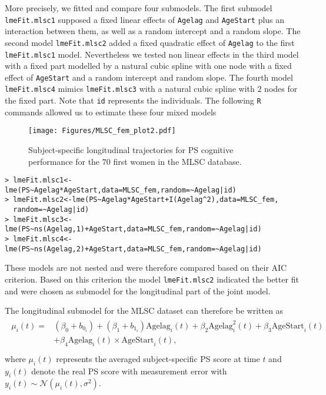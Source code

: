 \documentclass[12pt]{article}
\begin{document}
More precisely, we fitted and compare four submodels. The first submodel \texttt{lmeFit.mlsc1} supposed a fixed linear effects of \texttt{Agelag} and \texttt{AgeStart} plus an interaction between them, as well as a random intercept and a random slope. The second model \texttt{lmeFit.mlsc2} added a fixed quadratic effect of \texttt{Agelag} to the first \texttt{lmeFit.mlsc1} model. Nevertheless we tested non linear effects in the third model with a fixed part modelled by a natural cubic spline with one node with a fixed effect of \texttt{AgeStart} and a random intercept and random slope. The fourth model \texttt{lmeFit.mlsc4} mimics \texttt{lmeFit.mlsc3} with a natural cubic spline with $2$ nodes for the fixed part. Note that \texttt{id} represents the individuals. The following \texttt{R} commands allowed us to estimate these four mixed models
\begin{figure}[!tb]
\centering
\texttt{[image: Figures/MLSC\_fem\_plot2.pdf]}
\caption{Subject-specific longitudinal trajectories for PS cognitive performance for the $70$ first women in the MLSC database.}
\label{MLSCid_plot}
\end{figure}
\begin{verbatim}
> lmeFit.mlsc1<-lme(PS~Agelag*AgeStart,data=MLSC_fem,random=~Agelag|id)
> lmeFit.mlsc2<-lme(PS~Agelag*AgeStart+I(Agelag^2),data=MLSC_fem,
  random=~Agelag|id)
> lmeFit.mlsc3<-lme(PS~ns(Agelag,1)+AgeStart,data=MLSC_fem,random=~Agelag|id)
> lmeFit.mlsc4<-lme(PS~ns(Agelag,2)+AgeStart,data=MLSC_fem,random=~Agelag|id)
\end{verbatim}
These models are not nested and were therefore compared based on their AIC criterion. Based on this criterion the model \texttt{lmeFit.mlsc2} indicated the better fit and were chosen as submodel for the longitudinal part of the joint model.

The longitudinal submodel for the MLSC dataset can therefore be written as 
\begin{equation}
\begin{split}
\begin{aligned}
\mu_i(t) = &(\beta_0 +b_{0_{i}} )+(\beta_1+b_{1_{i}} )\text{Agelag}_i(t)+\beta_2 \text{Agelag}_i^2(t)+\beta_3 \text{AgeStart}_i(t) \\
&+\beta_4 \text{Agelag}_i(t) \times \text{AgeStart}_i(t),\\ 
\end{aligned}
\end{split}
\label{MLSC_Longitudinal model}
\end{equation}
where $\mu_i(t)$ represents the averaged subject-specific PS score at time $t$ and $y_{i}(t)$ denote the real PS score with measurement error with $y_{i}(t) \sim \mathcal{N}(\mu_i(t), \sigma^{2}) $.
\end{document}
